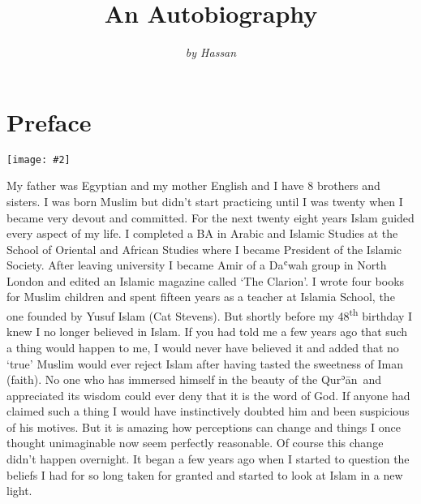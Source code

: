 \documentclass[12pt]{memoir}
\title{An Autobiography}
\author{\emph{by Hassan}}
\def\´{ʾ} %
\def\`{ʿ} %
\let \Sup=\textsuperscript
\def \Quran{Qur\-\´ān} %
\newcommand{\img}[3]{\begin{center}%
\texttt{[image: \#2]}\\{\small\em#3}%
\end{center}}
\begin{document}
\frontmatter

\maketitle
\thispagestyle{empty}
\cleardoublepage

\setcounter{page}{1}
\tableofcontents

\chapter{Preface}

\img{scale=0.1}{Tunis_Hassan.jpg}{}

My father was Egyptian and my mother English and I have 8 brothers and sisters.
I was born Muslim but didn’t start practicing until I was twenty
when I became very devout and committed.
For the next twenty eight years Islam guided every aspect of my life.
I completed a BA in Arabic and Islamic Studies at the School of Oriental
and African Studies where I became President of the Islamic Society.
After leaving university I became Amir of a Da\`wah group
in North London and edited an Islamic magazine called ‘The Clarion’.
I wrote four books for Muslim children and spent fifteen years as a teacher
at Islamia School, the one founded by Yusuf Islam (Cat Stevens).
But shortly before my 48\Sup{th} birthday I knew I no longer believed in Islam.
If you had told me a few years ago that such a thing would happen to me,
I would never have believed it and added that no ‘true’ Muslim
would ever reject Islam after having tasted the sweetness of Iman (faith).
No one who has immersed himself in the beauty of the \Quran\
and appreciated its wisdom could ever deny that it is the word of God.
If anyone had claimed such a thing I would have instinctively
doubted him and been suspicious of his motives.
But it is amazing how perceptions can change
and things I once thought unimaginable now seem perfectly reasonable.
Of course this change didn’t happen overnight.
It began a few years ago when I started to question the beliefs
I had for so long taken for granted
and started to look at Islam in a new light.
\end{document}
